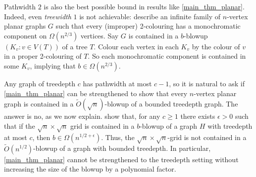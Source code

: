 \documentclass{patmorin}
\renewcommand{\geq}{\geqslant}
\renewcommand{\leq}{\leqslant}
\DeclareMathOperator{\pw}{pw}
\begin{document}
Pathwidth $2$ is also the best possible bound in results like  \cref{main_thm_planar}.  Indeed, even \emph{treewidth} $1$ is not achievable:  \citet{LMST08} describe an infinite family of $n$-vertex planar graphs $G$ such that every (improper) 2-colouring has a monochromatic component on $\Omega(n^{2/3})$ vertices. Say $G$ is contained in a $b$-blowup $(K_v:v\in V(T))$ of a tree $T$. Colour each vertex in each $K_v$ by the colour of $v$ in a proper 2-colouring of $T$. So each monochromatic component is contained in some $K_v$, implying that $b\in\Omega(n^{2/3})$.



Any graph of treedepth $c$ has pathwidth at most $c-1$, so it is natural to ask if \cref{main_thm_planar} can be strengthened to show that every $n$-vertex planar graph is contained in a $\tilde{O}(\sqrt{n})$-blowup of a bounded treedepth graph.  The answer is no, as we now explain. \citet[Theorem~19]{dvowoo} show that, for any $c\geq 1$ there exists $\epsilon>0$ such that if the $\sqrt{n}\times\sqrt{n}$ grid is contained in a $b$-blowup of a graph $H$ with treedepth at most $c$, then $b\in\Omega(n^{1/2+\epsilon})$. Thus, the $\sqrt{n}\times \sqrt{n}$-grid is not contained in a $\tilde{O}(n^{1/2})$-blowup of a graph with bounded treedepth.  In particular, \cref{main_thm_planar} cannot be strengthened to the treedepth setting without increasing the size of the blowup by a polynomial factor.


%
%
%
%
%
\end{document}
